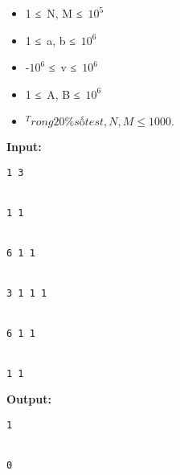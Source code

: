 \begin{itemize}
	\item     1 ≤ N, M ≤ $10^{5}$
	\item     1 ≤ a, b ≤ $10^{6}$
	\item     -$10^{6}$    ≤ v ≤ $10^{6}$
	\item     1 ≤ A, B ≤ $10^{6}$
	\item $^     Trong 20\% số test, N, M ≤ 1000.    $
\end{itemize}
\textbf{    Input:   }
\begin{verbatim}
1 3


1 1


6 1 1 


3 1 1 1 


6 1 1


1 1\end{verbatim}

\textbf{    Output:   }
\begin{verbatim}
1


0\end{verbatim}